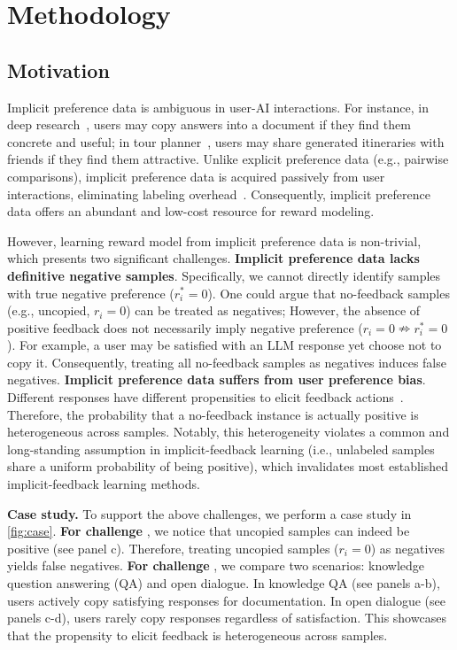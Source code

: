 \documentclass[]{arxiv_singlecolumn}
\theoremstyle{plain}
\theoremstyle{definition}
\theoremstyle{remark}
\begin{document}
\section{Methodology}

\subsection{Motivation}\label{sec:motivation}



Implicit preference data is ambiguous in user-AI interactions. For instance, in deep research~\citep{webthinker}, users may copy answers into a document if they find them concrete and useful; in tour planner~\citep{tourplanner}, users may share generated itineraries with friends if they find them attractive. Unlike explicit preference data (e.g., pairwise comparisons), implicit preference data is acquired passively from user interactions, eliminating labeling overhead~\citep{liu2025user}. Consequently, implicit preference data offers an abundant and low-cost resource for reward modeling.


However, learning reward model from implicit preference data is non-trivial, which presents two significant challenges.
 \textbf{Implicit preference data lacks definitive negative samples}. Specifically, we cannot directly identify samples with true negative preference ($r^*_i=0$). One could argue that no-feedback samples (e.g., uncopied, $r_i=0$) can be treated as negatives; However, the absence of positive feedback does not necessarily imply negative preference ($r_i=0\nRightarrow r^*_i=0$). For example, a user may be satisfied with an LLM response yet choose not to copy it. Consequently, treating all no-feedback samples as negatives induces false negatives.
 \textbf{Implicit preference data suffers from user preference bias}. Different responses have different propensities to elicit feedback actions~\citep{zhou2025two,wang2022sigirescm2,li2024kdddebiased}. Therefore, the probability that a no-feedback instance is actually positive is heterogeneous across samples. Notably, this heterogeneity violates a common and long-standing assumption in implicit-feedback learning (i.e., unlabeled samples share a uniform probability of being positive), which invalidates most established implicit-feedback learning methods.

\textbf{Case study.} To support the above challenges, we perform a case study in \autoref{fig:case}. \textbf{For challenge }, we notice that uncopied samples can indeed be positive (see panel c). Therefore, treating uncopied samples ($r_i=0$) as negatives yields false negatives. \textbf{For challenge }, we compare two scenarios: knowledge question answering (QA) and open dialogue. 
In knowledge QA (see panels a-b), users actively copy satisfying responses for documentation.
In open dialogue (see panels c-d), users rarely copy responses regardless of satisfaction.
This showcases that the propensity to elicit feedback is heterogeneous across samples.
\end{document}
